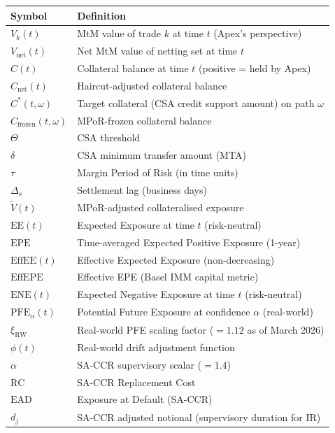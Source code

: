 \documentclass[11pt,a4paper]{article}
\begin{document}
\begin{longtable}{@{}ll@{}}
\toprule
\textbf{Symbol} & \textbf{Definition} \\
\midrule
\endhead
\bottomrule
\endfoot
$V_k(t)$          & MtM value of trade $k$ at time $t$ (Apex's perspective) \\
$V_{\text{net}}(t)$ & Net MtM value of netting set at time $t$ \\
$C(t)$            & Collateral balance at time $t$ (positive = held by Apex) \\
$C_{\text{net}}(t)$ & Haircut-adjusted collateral balance \\
$C^*(t, \omega)$  & Target collateral (CSA credit support amount) on path $\omega$ \\
$C_{\text{frozen}}(t, \omega)$ & MPoR-frozen collateral balance \\
$\Theta$          & CSA threshold \\
$\delta$          & CSA minimum transfer amount (MTA) \\
$\tau$            & Margin Period of Risk (in time units) \\
$\Delta_s$        & Settlement lag (business days) \\
$\tilde{V}(t)$    & MPoR-adjusted collateralised exposure \\
$\text{EE}(t)$    & Expected Exposure at time $t$ (risk-neutral) \\
$\text{EPE}$      & Time-averaged Expected Positive Exposure (1-year) \\
$\text{EffEE}(t)$ & Effective Expected Exposure (non-decreasing) \\
$\text{EffEPE}$   & Effective EPE (Basel IMM capital metric) \\
$\text{ENE}(t)$   & Expected Negative Exposure at time $t$ (risk-neutral) \\
$\text{PFE}_\alpha(t)$ & Potential Future Exposure at confidence $\alpha$ (real-world) \\
$\xi_{\text{RW}}$ & Real-world PFE scaling factor ($= 1.12$ as of March 2026) \\
$\phi(t)$         & Real-world drift adjustment function \\
$\alpha$          & SA-CCR supervisory scalar ($= 1.4$) \\
$\text{RC}$       & SA-CCR Replacement Cost \\
$\text{EAD}$      & Exposure at Default (SA-CCR) \\
$d_j$             & SA-CCR adjusted notional (supervisory duration for IR) \\

\end{longtable}
\end{document}
